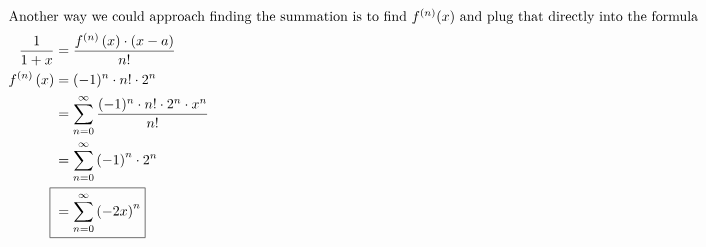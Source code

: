 \documentclass[12pt]{article}
\begin{document}
\begin{align}
  \intertext{Another way we could approach finding the summation is to find $f^{(n)}(x)$ and plug that directly into the formula}
  \frac{1}{1+x}                    & =\frac{f^{\left(n\right)}\left(x\right)\cdot\left(x-a\right)}{n!}  \\
  f^{\left(n\right)}\left(x\right) & =(-1)^n\cdot n!\cdot2^{n}                                          \\
                                   & =\sum_{n=0}^{\infty}\frac{(-1)^n\cdot n!\cdot2^{n}\cdot x^{n}}{n!} \\
                                   & =\sum_{n=0}^{\infty}\left(-1\right)^{n}\cdot2^{n}                  \\
  \Aboxed{ {}                      & =\sum_{n=0}^{\infty}\left(-2x\right)^{n}}                          \\
\end{align}
\end{document}
